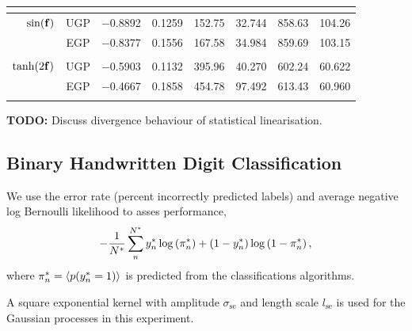 \documentclass{article} %
\begin{document}
\begin{table}[htb]
\begin{tabular}{r|c| c c c c c c}
            & \cite{Opper2009} \\
        \midrule
        $\sin\!\left({\mathbf{f}}\right)$ 
            & UGP & $-$0.8892 & 0.1259 & 152.75 & 32.744 & 858.63
                & 104.26 \\
            & EGP & $-$0.8377 & 0.1556 & 167.58 & 34.984 & 859.69 & 103.15 \\
            & \cite{Opper2009} \\
        \midrule
        $\tanh\!\left({2\mathbf{f}}\right)$
            & UGP & $-$0.5903 & 0.1132 & 395.96 & 40.270 & 602.24 
                & 60.622 \\
            & EGP & $-$0.4667 & 0.1858 & 454.78 & 97.492 & 613.43 & 60.960 \\
            & \cite{Opper2009} \\
        \bottomrule
    \end{tabular}
\end{table}


\textbf{TODO:} Discuss divergence behaviour of statistical linearisation.


\subsection{Binary Handwritten Digit Classification}

We use the error rate (percent incorrectly predicted labels) and average 
negative log Bernoulli likelihood to asses performance,
\begin{equation}
    - \frac{1}{N^{*}} \sum^{N^{*}}_{n} y^{*}_n 
        \log\left({\pi^{*}_n}\right)
    + \left({1-y^{*}_n}\right)\log\left({1 - \pi^{*}_n}\right),
\end{equation}
where $\pi^{*}_n = \left\langle{\ensuremath{p\!\left({y^{*}_n = 1}\right)}}\right\rangle_{}$ is predicted from the
classifications algorithms.

A square exponential kernel with amplitude $\sigma_\text{se}$ and length
scale $l_\text{se}$ is used for the Gaussian processes in this experiment.
\end{document}
